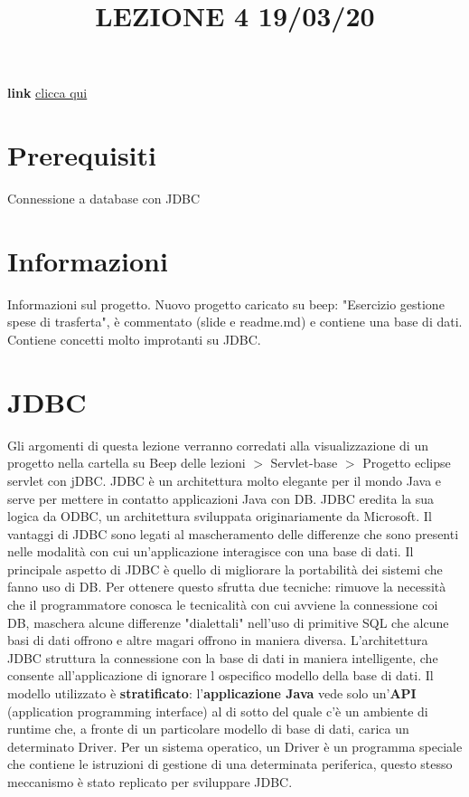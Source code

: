 \title{LEZIONE 4 19/03/20}\newline
\textbf{link} \href{https://web.microsoftstream.com/video/53d9a40e-3109-44fc-8195-0553eedfb6d9}{clicca qui}
\section*{Prerequisiti}
Connessione a database con JDBC
\section*{Informazioni}
Informazioni sul progetto.\newline
Nuovo progetto caricato su beep: "Esercizio gestione spese di trasferta", è commentato (slide e readme.md) e contiene una base di dati. Contiene concetti molto improtanti su JDBC.
\section{JDBC}
Gli argomenti di questa lezione verranno corredati alla visualizzazione di un progetto nella cartella su Beep delle lezioni $>$ Servlet-base $>$ Progetto eclipse servlet con jDBC.\newline
\newline
JDBC è un architettura molto elegante per il mondo Java e serve per mettere in contatto applicazioni Java con DB.\newline
JDBC eredita la sua logica da ODBC, un architettura sviluppata originariamente da Microsoft.\newline
\newline
Il vantaggi di JDBC sono legati al mascheramento delle differenze che sono presenti nelle modalità con cui un'applicazione interagisce con una base di dati. Il principale aspetto di JDBC è quello di migliorare la portabilità dei sistemi che fanno uso di DB. Per ottenere questo sfrutta due tecniche: rimuove la necessità che il programmatore conosca le tecnicalità con cui avviene la connessione coi DB, maschera alcune differenze "dialettali" nell'uso di primitive SQL che alcune basi di dati offrono e altre magari offrono in maniera diversa.\newline
\newline
L'architettura JDBC struttura la connessione con la base di dati in maniera intelligente, che consente all'applicazione di ignorare l ospecifico modello della base di dati. Il modello utilizzato è \textbf{stratificato}: l'\textbf{applicazione Java} vede solo un'\textbf{API} (application programming interface) al di sotto del quale c'è un ambiente di runtime che, a fronte di un particolare modello di base di dati, carica un determinato Driver. Per un sistema operatico, un Driver è un programma speciale che contiene le istruzioni di gestione di una determinata periferica, questo stesso meccanismo è stato replicato per sviluppare JDBC.\newline
